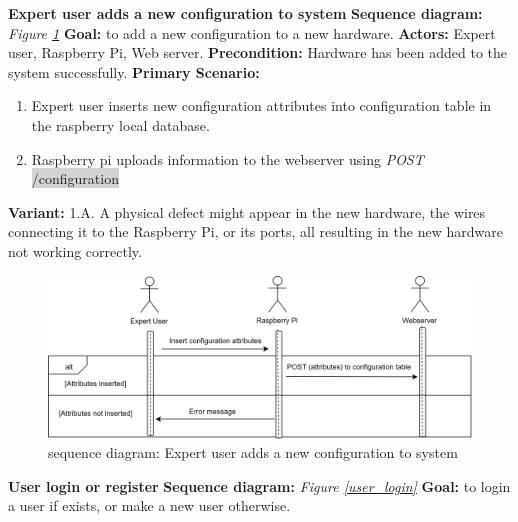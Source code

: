 \documentclass[12pt, oneside, a4paper]{book}
\newcommand{\code}[1]{{\color{red}\colorbox{lightgray}{#1}}}
\newcommand\boldcolor[1]{\textcolor{bold}{\textbf{#1}}}
\begin{document}
				\newpage\hspace*{-6mm}\boldcolor{Expert user adds a new configuration to system}
				\newline\textbf{Sequence diagram:} \textit{Figure \ref{admin_config}}
				\newline\textbf{Goal:} to add a new configuration to a new hardware.
				\newline\textbf{Actors:} Expert user, Raspberry Pi, Web server.
				\newline\textbf{Precondition:} Hardware has been added to the system successfully.
				\newline\textbf{Primary Scenario:}	
				\begin{enumerate}[label*=\arabic*.]
					\item Expert user inserts new configuration attributes into configuration table in the raspberry local database. 
					\item Raspberry pi uploads information to the webserver using \textit{POST} \code{/configuration}
				\end{enumerate}
				\textbf{Variant:}\newline
				\hspace*{5mm}1.A. A physical defect might appear in the new hardware, the wires connecting it to the Raspberry Pi, or its ports, all resulting in the new hardware not working correctly. \\
				\begin{figure}[H]
					\includegraphics[width=\linewidth]{img/sequence_add_config.png}
					\caption{sequence diagram: Expert user adds a new configuration to system}
					\label{admin_config}
				\end{figure}
				\newpage\hspace*{-6mm}\boldcolor{User login or register}
				\newline\textbf{Sequence diagram:} \textit{Figure \ref{user_login}}
				\newline\textbf{Goal:} to login a user if exists, or make a new user otherwise.
\end{document}
